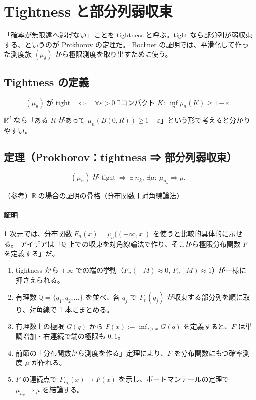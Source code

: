 \documentclass[uplatex,dvipdfmx,11pt,a4paper,openany]{bxjsbook}
\begin{document}
\section{Tightness と部分列弱収束}
「確率が無限遠へ逃げない」ことを tightness と呼ぶ。tight なら部分列が弱収束する、というのが Prokhorov の定理だ。
	        Bochner の証明では、平滑化して作った測度族 $(\mu_\delta)$ から極限測度を取り出すために使う。

\subsection{Tightness の定義}
\[(\mu_n)\ \text{が tight}
        \quad\Longleftrightarrow\quad
        \forall\varepsilon>0\ \exists\text{コンパクト }K:\ \inf_n \mu_n(K)\ge 1-\varepsilon.\]

$\mathbb R^d$ なら「ある $R$ があって $\mu_n(B(0,R))\ge 1-\varepsilon$」という形で考えると分かりやすい。

\subsection{定理（Prokhorov：tightness ⇒ 部分列弱収束）}
\[(\mu_n)\ \text{が tight} \ \Rightarrow\
        \exists\ n_k,\ \exists\mu:\ \mu_{n_k}\Rightarrow\mu.\]

\begin{detailblock}{（参考）$\mathbb R$ の場合の証明の骨格（分布関数＋対角線論法）}
\paragraph{証明}
1 次元では、分布関数 $F_n(x)=\mu_n((-\infty,x])$ を使うと比較的具体的に示せる。
	            アイデアは「$\mathbb Q$ 上での収束を対角線論法で作り、そこから極限分布関数 $F$ を定義する」だ。

\begin{enumerate}
\item tightness から $\pm\infty$ での端の挙動（$F_n(-M)\approx 0$, $F_n(M)\approx 1$）が一様に押さえられる。
\item 有理数 $\mathbb Q=\{q_1,q_2,\dots\}$ を並べ、各 $q_j$ で $F_n(q_j)$ が収束する部分列を順に取り、対角線で 1 本にまとめる。
\item 有理数上の極限 $G(q)$ から $F(x):=\inf_{q>x}G(q)$ を定義すると、$F$ は単調増加・右連続で端の極限も $0,1$。
\item 前節の「分布関数から測度を作る」定理により、$F$ を分布関数にもつ確率測度 $\mu$ が作れる。
\item $F$ の連続点で $F_{n_k}(x)\to F(x)$ を示し、ポートマンテールの定理で $\mu_{n_k}\Rightarrow\mu$ を結論する。
\end{enumerate}


\end{detailblock}
\end{document}
